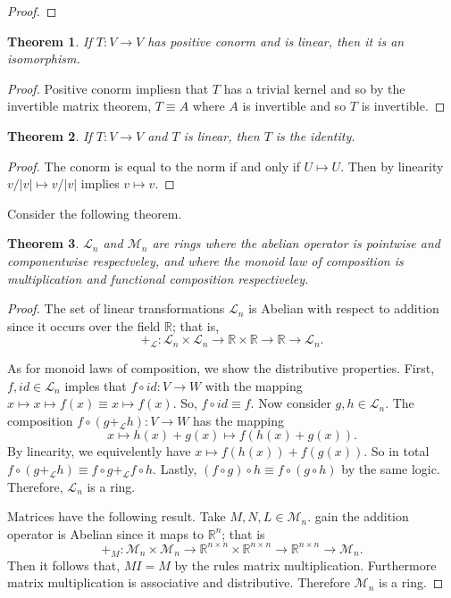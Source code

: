 \documentclass[letter]{article}
\newtheorem{theorem}{Theorem}
\newenvironment{menumerate}{%
  \edef\backupindent{\the\parindent}%
  \enumerate%
  \setlength{\parindent}{\backupindent}%
}{\endenumerate}
\begin{document}
\begin{menumerate}
\begin{proof}
	\end{proof}

	\begin{theorem}
		If $T: V \to V$ has positive conorm and is linear, then it is an isomorphism.
	\end{theorem}
	\begin{proof}
		Positive conorm impliesn that $T$ has a trivial kernel and so by the invertible matrix theorem,
		$T \equiv A$ where $A$ is invertible and so $T$ is invertible.
	\end{proof}

	\begin{theorem}
	If $T:V \to V$ and $T$ is linear, then $T$ is the identity.
	\end{theorem}
	\begin{proof}
		The conorm is equal to the norm if and only if $U \mapsto U.$ Then by linearity $v/|v| \mapsto v/|v|$ implies 
		$v \mapsto v.$
	\end{proof}

	\setcounter{enumi}{5}
	\item %
	Consider the following theorem.
	\begin{theorem}
		$\mathcal{L}_n$ and $\mathcal{M}_n$ are rings where the abelian operator is
		pointwise and componentwise respectveley, and where the monoid
		law of composition is multiplication and functional composition 
		respectiveley.
	\end{theorem}
	\begin{proof}
		The set of linear transformations $\mathcal{L}_n$  is Abelian with respect to
		addition since it occurs over the field $\mathbb{R}$; that is,
		 $$+_\mathcal{L} : \mathcal{L}_n\times \mathcal{L}_n \to \mathbb{R} \times \mathbb{R} \to \mathbb{R} \to \mathcal{L}_n.$$


		As for monoid laws of composition, we show the distributive properties. First,
		$f, id \in \mathcal{L}_n$ imples that $f \circ id : V \to W$ with the mapping
		$x \mapsto x \mapsto f(x) \equiv x \mapsto f(x)$. So, $f \circ id \equiv f.$
		Now consider $g,h \in \mathcal{L}_n.$ The composition $f \circ (g +_\mathcal{L} h): V \to W$
		has the mapping
		$$x \mapsto h(x) + g(x) \mapsto f(h(x) + g(x)).$$
		By linearity, we equivelently have $x \mapsto f(h(x)) + f(g(x)).$ So in total
		$f \circ(g +_\mathcal{L} h) \equiv f \circ g +_\mathcal{L} f \circ h.$ Lastly,
		$(f \circ  g) \circ h \equiv f \circ (g \circ h)$ by the same logic. Therefore, $\mathcal{L}_n$ is a ring.
		
		Matrices have the following result. Take $M,N,L \in \mathcal{M}_n$.
		gain the addition operator is Abelian since it maps to $\mathbb{R}^n$; that is
		$$+_M: \mathcal{M}_n \times \mathcal{M}_n \to \mathbb{R}^{n\times n} \times \mathbb{R}^{n\times n} \to \mathbb{R}^{n\times n} \to \mathcal{M}_n.$$ 
		Then it follows that, $MI = M$ by the rules matrix multiplication. 
		Furthermore matrix multiplication is associative and distributive. Therefore 
		$\mathcal{M}_n$ is a ring.


\end{proof}
\end{menumerate}
\end{document}
